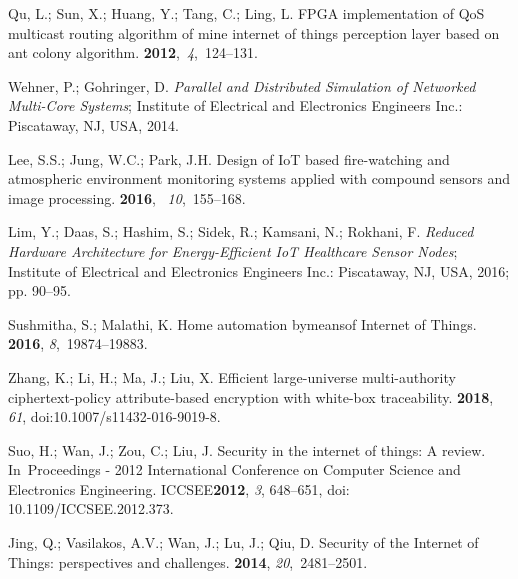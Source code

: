 \documentclass[symmetry,article,accept,moreauthors,pdftex10pt,a4paper]{mdpi}
\begin{document}
\begin{thebibliography}{999}
Qu, L.; Sun, X.; Huang, Y.; Tang, C.; Ling, L.
\newblock FPGA implementation of QoS multicast routing algorithm of mine
internet of things perception layer based on ant colony algorithm.
 {\bf
	2012},~{\em 4},~124--131.

Wehner, P.; Gohringer, D.
\newblock \emph{Parallel and Distributed Simulation of Networked Multi-Core Systems};
\newblock Institute of Electrical and Electronics Engineers Inc.: Piscataway, NJ, USA, 2014.

Lee, S.S.; Jung, W.C.; Park, J.H.
\newblock Design of IoT based fire-watching and atmospheric environment
monitoring systems applied with compound sensors and image processing.
 {\bf 2016},~{\em
	10},~155--168.

Lim, Y.; Daas, S.; Hashim, S.; Sidek, R.; Kamsani, N.; Rokhani, F.
\newblock \emph{Reduced Hardware Architecture for Energy-Efficient IoT Healthcare
	Sensor Nodes};
\newblock Institute of Electrical and Electronics Engineers Inc.: Piscataway, NJ, USA, 2016; pp.
90--95.

Sushmitha, S.; Malathi, K.
\newblock Home automation bymeansof Internet of Things.
 {\bf 2016},
{\em 8},~19874--19883.

Zhang, K.; Li, H.; Ma, J.; Liu, X.
\newblock Efficient large-universe multi-authority ciphertext-policy
attribute-based encryption with white-box traceability.
 {\bf 2018}, {\em 61}, doi:10.1007/s11432-016-9019-8.

Suo, H.; Wan, J.; Zou, C.; Liu, J.
\newblock Security in the internet of things: A review.
\newblock In~Proceedings - 2012 International Conference on Computer Science and Electronics Engineering.
\newblock ICCSEE\textbf{2012}, \emph{3}, 648--651, doi: 10.1109/ICCSEE.2012.373.

Jing, Q.; Vasilakos, A.V.; Wan, J.; Lu, J.; Qiu, D.
\newblock Security of the Internet of Things: perspectives and challenges.
 {\bf 2014}, {\em 20},~2481--2501.


\end{thebibliography}
\end{document}
